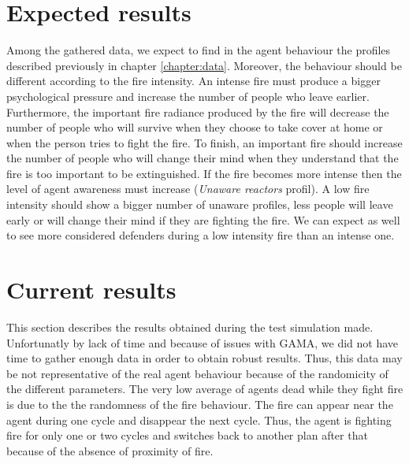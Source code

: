 \documentclass[12pt, a4paper]{memoir} %
\begin{document}
	\section{Expected results}

		Among the gathered data, we expect to find in the agent behaviour the profiles described previously in chapter \ref{chapter:data}.
		Moreover, the behaviour should be different according to the fire intensity. An intense fire must produce a bigger psychological
		pressure and increase the number of people who leave earlier. Furthermore, the important fire radiance produced by the fire will
		decrease the number of people who will survive when they choose to take cover at home or when the person tries to fight
		the fire. To finish, an important fire should increase the number of people who will change their mind when they understand that
		the fire is too important to be extinguished. If the fire becomes more intense then the level of agent awareness must increase
		(\textit{Unaware reactors} profil).
		A low fire intensity should show a bigger number of unaware profiles, less people will leave early or will change their mind if they
		are fighting the fire. We can expect as well to see more considered defenders during a low intensity fire than an intense one.


	\section{Current results}

		This section describes the results obtained during the test simulation made. Unfortunatly by lack of time and because
		of issues with GAMA, we did not have time to gather enough data in order to obtain robust results. Thus, this data may be not representative
		of the real agent behaviour because of the randomicity of the different parameters. The very low average of agents dead while they fight fire
		is due to the the randomness of the fire behaviour. The fire can appear near the agent during one cycle and disappear the next cycle. Thus,
		the agent is fighting fire for only one or two cycles and switches back to another plan after that because of the absence of proximity of fire.
\end{document}
